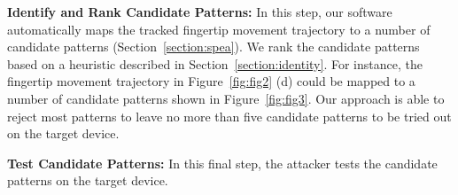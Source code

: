      \vspace{2mm}
    \noindent {} \textbf{Identify and Rank Candidate Patterns:} In this step, our software automatically maps the tracked fingertip movement trajectory to a number of candidate patterns (Section~\ref{section:spea}).
    We rank the candidate patterns based on a heuristic described in Section~\ref{section:identity}.
    For instance, the fingertip movement trajectory in Figure~\ref{fig:fig2} (d) could be mapped to a number of candidate patterns shown in Figure~\ref{fig:fig3}.
    Our approach is able to reject most patterns to leave no more than five candidate patterns to be tried out on the target device.

     \vspace{2mm}
    \noindent {} \textbf{Test Candidate Patterns:} In this final step, the attacker tests the candidate patterns on the target device.


